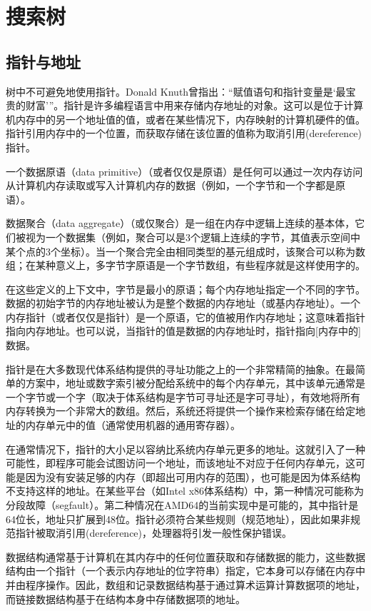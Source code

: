 \chapter{搜索树}
\section{指针与地址}

树中不可避免地使用指针。Donald Knuth曾指出：“赋值语句和指针变量是‘最宝贵的财富’”\cite{10.1145/356635.356640}。指针是许多编程语言中用来存储内存地址的对象。这可以是位于计算机内存中的另一个地址值的值，或者在某些情况下，内存映射的计算机硬件的值。指针引用内存中的一个位置，而获取存储在该位置的值称为取消引用(dereference)指针\cite{enwiki:1015276279}。

一个数据原语（data primitive）（或者仅仅是原语）是任何可以通过一次内存访问从计算机内存读取或写入计算机内存的数据（例如，一个字节和一个字都是原语）。

数据聚合（data aggregate）（或仅聚合）是一组在内存中逻辑上连续的基本体，它们被视为一个数据集（例如，聚合可以是3个逻辑上连续的字节，其值表示空间中某个点的3个坐标）。当一个聚合完全由相同类型的基元组成时，该聚合可以称为数组；在某种意义上，多字节字原语是一个字节数组，有些程序就是这样使用字的。

在这些定义的上下文中，字节是最小的原语；每个内存地址指定一个不同的字节。数据的初始字节的内存地址被认为是整个数据的内存地址（或基内存地址）。一个内存指针（或者仅仅是指针）是一个原语，它的值被用作内存地址；这意味着指针指向内存地址。也可以说，当指针的值是数据的内存地址时，指针指向[内存中的]数据。

指针是在大多数现代体系结构提供的寻址功能之上的一个非常精简的抽象。在最简单的方案中，地址或数字索引被分配给系统中的每个内存单元，其中该单元通常是一个字节或一个字（取决于体系结构是字节可寻址还是字可寻址），有效地将所有内存转换为一个非常大的数组。然后，系统还将提供一个操作来检索存储在给定地址的内存单元中的值（通常使用机器的通用寄存器）。

在通常情况下，指针的大小足以容纳比系统内存单元更多的地址。这就引入了一种可能性，即程序可能会试图访问一个地址，而该地址不对应于任何内存单元，这可能是因为没有安装足够的内存（即超出可用内存的范围），也可能是因为体系结构不支持这样的地址。在某些平台（如Intel x86体系结构）中，第一种情况可能称为分段故障（segfault）。第二种情况在AMD64的当前实现中是可能的，其中指针是64位长，地址只扩展到48位。指针必须符合某些规则（规范地址），因此如果非规范指针被取消引用(dereference)，处理器将引发一般性保护错误。

数据结构通常基于计算机在其内存中的任何位置获取和存储数据的能力，这些数据结构由一个指针（一个表示内存地址的位字符串）指定，它本身可以存储在内存中并由程序操作。因此，数组和记录数据结构基于通过算术运算计算数据项的地址，而链接数据结构基于在结构本身中存储数据项的地址。\cite{enwiki:1025932291}

